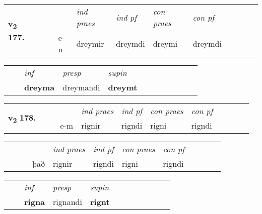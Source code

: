\begin{tabular}{llllllllllll}\toprule
\multirow{4}{*}{{{\textbf{v{\textsubscript{2}}} \Large{\textbf{177.}}}}}  & &  & &  \textit{ind praes} & \textit{ind pf} & \textit{con praes} & \textit{con pf} \\*
&  & & e-n & dreymir & dreymdi & dreymi & dreymdi \\*
\cmidrule{5-9}
\end{tabular}


\begin{tabular}{llllllllllll}
 & & \textit{inf}     & \textit{presp} & \textit{supin}       \\*
  & & \textbf{dreyma}      & dreymandi &  \textbf{dreymt}   \\*
\cmidrule{1-12}
\end{tabular}





\begin{tabular}{llllllllllll}\toprule
\multirow{4}{*}{{{\textbf{v{\textsubscript{2}}} \Large{\textbf{178.}}}}}  & &  & &  \textit{ind praes} & \textit{ind pf} & \textit{con praes} & \textit{con pf} \\*
&  & & e-m & rignir & rigndi & rigni & rigndi \\*
\cmidrule{5-9}
\end{tabular}


\begin{tabular}{llllllllllll}
 & &  & &  \textit{ind praes} & \textit{ind pf} & \textit{con praes} & \textit{con pf} \\*
&  & & það & rignir & rigndi & rigni & rigndi \\*
\cmidrule{5-9}
\end{tabular}


\begin{tabular}{llllllllllll}
 & & \textit{inf}     & \textit{presp} & \textit{supin}       \\*
  & & \textbf{rigna}      & rignandi &  \textbf{rignt}   \\*
\cmidrule{1-12}
\end{tabular}



